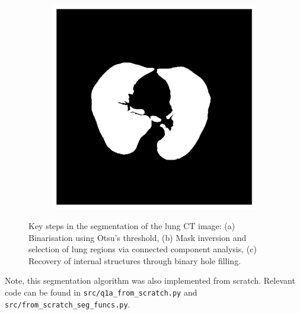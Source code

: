 \documentclass[11pt]{article}
\begin{document}
\begin{figure}[H]
\begin{subfigure}{.3\textwidth}
            \caption{}
            \label{fig:connected_components}
        \end{subfigure}%
        \begin{subfigure}{.3\textwidth}
            \centering
            \includegraphics[width=\linewidth]{figs/q1a_filled_holes.png}  %
            \caption{}
            \label{fig:filled_holes}
        \end{subfigure}
        \label{fig:segmentation_steps}
    \caption{Key steps in the segmentation of the lung CT image: (a) Binarisation using Otsu's threshold, (b) Mask inversion and selection of lung regions via connected component analysis, (c) Recovery of internal structures through binary hole filling.}
    \end{figure}
Note, this segmentation algorithm was also implemented from scratch. Relevant code can be found in \texttt{src/q1a\_from\_scratch.py} and \texttt{src/from\_scratch\_seg\_funcs.py}.
\end{document}
